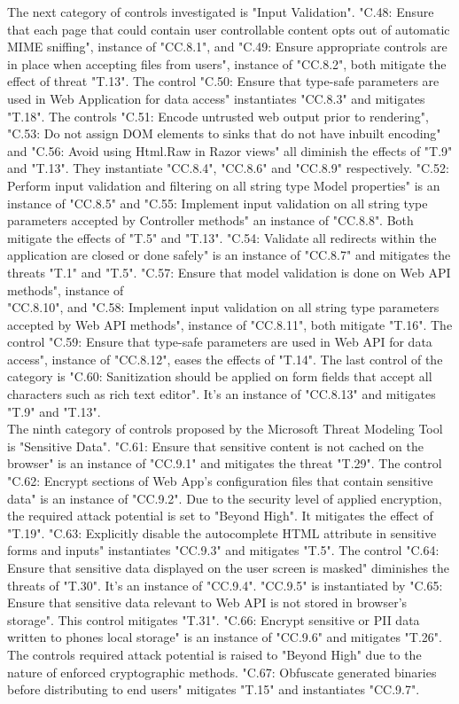 The next category of controls investigated is "Input Validation". "C.48: Ensure that each page that could contain user controllable content opts out of automatic MIME sniffing", instance of "CC.8.1", and "C.49: Ensure appropriate controls are in place when accepting files from users", instance of "CC.8.2", both mitigate the effect of threat "T.13". The control "C.50: Ensure that type-safe parameters are used in Web Application for data access" instantiates "CC.8.3" and mitigates "T.18". The controls "C.51: Encode untrusted web output prior to rendering", "C.53: Do not assign DOM elements to sinks that do not have inbuilt encoding" and "C.56: Avoid using Html.Raw in Razor views" all diminish the effects of "T.9" and "T.13". They instantiate "CC.8.4", "CC.8.6" and "CC.8.9" respectively. "C.52: Perform input validation and filtering on all string type Model properties" is an instance of "CC.8.5" and "C.55: Implement input validation on all string type parameters accepted by Controller methods" an instance of "CC.8.8". Both mitigate the effects of "T.5" and "T.13". "C.54: Validate all redirects within the application are closed or done safely" is an instance of "CC.8.7" and mitigates the threats "T.1" and "T.5". "C.57: Ensure that model validation is done on Web API methods", instance of \\"CC.8.10", and "C.58: Implement input validation on all string type parameters accepted by Web API methods", instance of "CC.8.11", both mitigate "T.16". The control "C.59: Ensure that type-safe parameters are used in Web API for data access", instance of "CC.8.12", eases the effects of "T.14". The last control of the category is "C.60: Sanitization should be applied on form fields that accept all characters such as rich text editor". It's an instance of "CC.8.13" and mitigates "T.9" and "T.13".\\ 
\newline
The ninth category of controls proposed by the Microsoft Threat Modeling Tool is "Sensitive Data". "C.61: Ensure that sensitive content is not cached on the browser" is an instance of "CC.9.1" and mitigates the threat "T.29". The control "C.62: Encrypt sections of Web App's configuration files that contain sensitive data" is an instance of "CC.9.2". Due to the security level of applied encryption, the required attack potential is set to "Beyond High". It mitigates the effect of "T.19". "C.63: Explicitly disable the autocomplete HTML attribute in sensitive forms and inputs" instantiates "CC.9.3" and mitigates "T.5". The control "C.64: Ensure that sensitive data displayed on the user screen is masked" diminishes the threats of "T.30". It's an instance of "CC.9.4". "CC.9.5" is instantiated by "C.65: Ensure that sensitive data relevant to Web API is not stored in browser's storage". This control mitigates "T.31". "C.66: Encrypt sensitive or PII data written to phones local storage" is an instance of "CC.9.6" and mitigates "T.26". The controls required attack potential is raised to "Beyond High" due to the nature of enforced cryptographic methods. "C.67: Obfuscate generated binaries before distributing to end users" mitigates "T.15" and instantiates "CC.9.7". \\

